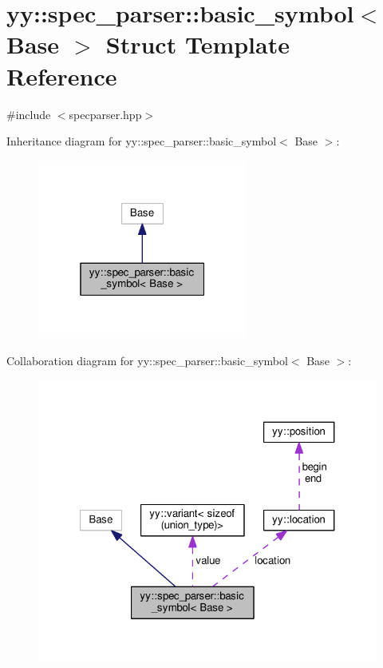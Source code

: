 \hypertarget{structyy_1_1spec__parser_1_1basic__symbol}{}\section{yy\+:\+:spec\+\_\+parser\+:\+:basic\+\_\+symbol$<$ Base $>$ Struct Template Reference}
\label{structyy_1_1spec__parser_1_1basic__symbol}


{\ttfamily \#include $<$specparser.\+hpp$>$}



Inheritance diagram for yy\+:\+:spec\+\_\+parser\+:\+:basic\+\_\+symbol$<$ Base $>$\+:\nopagebreak
\begin{figure}[H]
\begin{center}
\leavevmode
\includegraphics[width=196pt]{structyy_1_1spec__parser_1_1basic__symbol__inherit__graph}
\end{center}
\end{figure}


Collaboration diagram for yy\+:\+:spec\+\_\+parser\+:\+:basic\+\_\+symbol$<$ Base $>$\+:\nopagebreak
\begin{figure}[H]
\begin{center}
\leavevmode
\includegraphics[width=321pt]{structyy_1_1spec__parser_1_1basic__symbol__coll__graph}
\end{center}
\end{figure}
